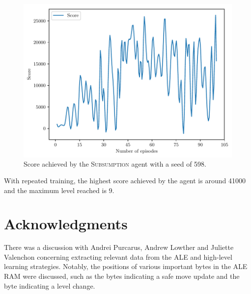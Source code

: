 \documentclass[a4paper,titlepage]{article}
\begin{document}
	\begin{figure}[!htb]
		\centering
		\includegraphics[width=\columnwidth]{plots/seed598.pdf}
		\caption
		{Score achieved by the \textsc{Subsumption} agent with a seed of 598.}
		\label{fig:seed598}
	\end{figure}

	With repeated training, the highest score achieved by the agent is around 41000 and the maximum level reached is 9.

	\section*{Acknowledgments}
	There was a discussion with Andrei Purcarus, Andrew Lowther and Juliette Valenchon concerning extracting relevant data from the ALE and high-level learning strategies. Notably, the positions of various important bytes in the ALE RAM were discussed, such as the bytes indicating a safe move update and the byte indicating a level change.
	
	
	
	{}
	
\end{document}
